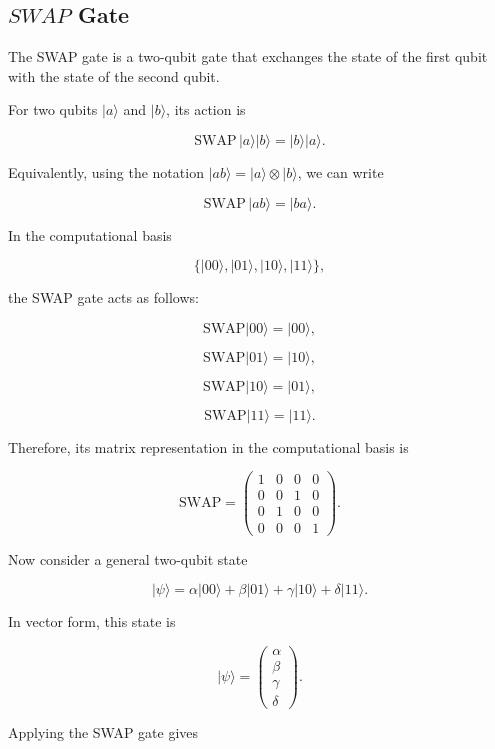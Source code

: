 \documentclass[10pt,a4paper]{article}
\begin{document}
\subsection{$SWAP$ Gate}

The SWAP gate is a two-qubit gate that exchanges the state of the first qubit with the state of the second qubit.

For two qubits \(|a\rangle\) and \(|b\rangle\), its action is

\[
\mathrm{SWAP}\, |a\rangle |b\rangle = |b\rangle |a\rangle .
\]

Equivalently, using the notation \(|ab\rangle = |a\rangle \otimes |b\rangle\), we can write

\[
\mathrm{SWAP}\, |ab\rangle = |ba\rangle .
\]

In the computational basis

\[
\{|00\rangle, |01\rangle, |10\rangle, |11\rangle\},
\]

the SWAP gate acts as follows:

\[
\mathrm{SWAP}|00\rangle = |00\rangle,
\]

\[
\mathrm{SWAP}|01\rangle = |10\rangle,
\]

\[
\mathrm{SWAP}|10\rangle = |01\rangle,
\]

\[
\mathrm{SWAP}|11\rangle = |11\rangle.
\]

Therefore, its matrix representation in the computational basis is

\[
\mathrm{SWAP}
=
\begin{pmatrix}
1 & 0 & 0 & 0 \\
0 & 0 & 1 & 0 \\
0 & 1 & 0 & 0 \\
0 & 0 & 0 & 1
\end{pmatrix}.
\]

Now consider a general two-qubit state

\[
|\psi\rangle
=
\alpha |00\rangle
+
\beta |01\rangle
+
\gamma |10\rangle
+
\delta |11\rangle.
\]

In vector form, this state is

\[
|\psi\rangle
=
\begin{pmatrix}
\alpha \\
\beta \\
\gamma \\
\delta
\end{pmatrix}.
\]

Applying the SWAP gate gives
\end{document}
